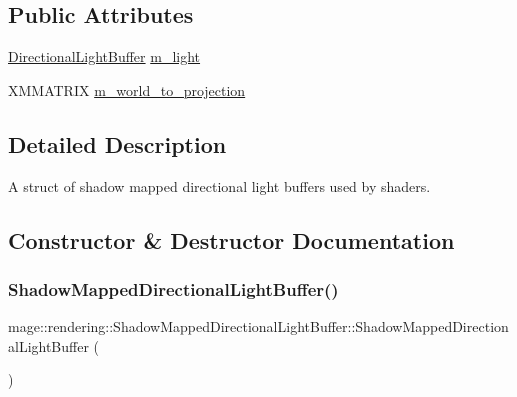 \subsection*{Public Attributes}
\begin{DoxyCompactItemize}
\item 
\hyperlink{structmage_1_1rendering_1_1_directional_light_buffer}{Directional\+Light\+Buffer} \hyperlink{structmage_1_1rendering_1_1_shadow_mapped_directional_light_buffer_a3aa791aa543feb7a92a42251ea6b655e}{m\+\_\+light}
\item 
X\+M\+M\+A\+T\+R\+IX \hyperlink{structmage_1_1rendering_1_1_shadow_mapped_directional_light_buffer_a293c5a1f5ce4a21b713df0ea9a088750}{m\+\_\+world\+\_\+to\+\_\+projection}
\end{DoxyCompactItemize}


\subsection{Detailed Description}
A struct of shadow mapped directional light buffers used by shaders. 

\subsection{Constructor \& Destructor Documentation}
\hypertarget{structmage_1_1rendering_1_1_shadow_mapped_directional_light_buffer_ad3467d873a7c1b756df37458b49bf43f}{}\label{structmage_1_1rendering_1_1_shadow_mapped_directional_light_buffer_ad3467d873a7c1b756df37458b49bf43f} 
\subsubsection{\texorpdfstring{Shadow\+Mapped\+Directional\+Light\+Buffer()}{ShadowMappedDirectionalLightBuffer()}\hspace{0.1cm}{\footnotesize\ttfamily [1/3]}}
{\footnotesize\ttfamily mage\+::rendering\+::\+Shadow\+Mapped\+Directional\+Light\+Buffer\+::\+Shadow\+Mapped\+Directional\+Light\+Buffer (\begin{DoxyParamCaption}{ }\end{DoxyParamCaption})\hspace{0.3cm}{\ttfamily [noexcept]}}

